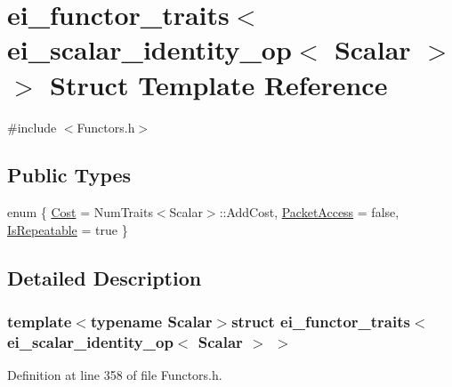 \hypertarget{structei__functor__traits_3_01ei__scalar__identity__op_3_01_scalar_01_4_01_4}{\section{ei\-\_\-functor\-\_\-traits$<$ ei\-\_\-scalar\-\_\-identity\-\_\-op$<$ Scalar $>$ $>$ Struct Template Reference}
\label{structei__functor__traits_3_01ei__scalar__identity__op_3_01_scalar_01_4_01_4}
}


{\ttfamily \#include $<$Functors.\-h$>$}

\subsection*{Public Types}
\begin{DoxyCompactItemize}
\item 
enum \{ \hyperlink{structei__functor__traits_3_01ei__scalar__identity__op_3_01_scalar_01_4_01_4_a0ddb2383fd3752916935fc916c7a1996a492781d94e8555717137bcc882f902c7}{Cost} = Num\-Traits$<$Scalar$>$\-:\-:Add\-Cost, 
\hyperlink{structei__functor__traits_3_01ei__scalar__identity__op_3_01_scalar_01_4_01_4_a0ddb2383fd3752916935fc916c7a1996a6419f6372511b498a01c9a1480aaa8c1}{Packet\-Access} = false, 
\hyperlink{structei__functor__traits_3_01ei__scalar__identity__op_3_01_scalar_01_4_01_4_a0ddb2383fd3752916935fc916c7a1996aee3a9617071f1956a2646a6b38955ad1}{Is\-Repeatable} = true
 \}
\end{DoxyCompactItemize}


\subsection{Detailed Description}
\subsubsection*{template$<$typename Scalar$>$struct ei\-\_\-functor\-\_\-traits$<$ ei\-\_\-scalar\-\_\-identity\-\_\-op$<$ Scalar $>$ $>$}



Definition at line 358 of file Functors.\-h.



